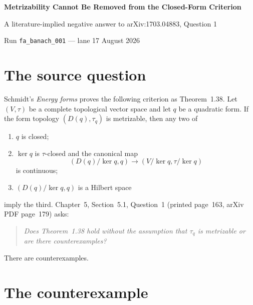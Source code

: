\documentclass[11pt]{article}
\begin{document}
\begin{center}
{\Large\bfseries Metrizability Cannot Be Removed from the Closed-Form Criterion}\par
\vspace{0.5em}
{\large A literature-implied negative answer to arXiv:1703.04883, Question 1}\par
\vspace{0.4em}
Run \texttt{fa\_banach\_001} --- lane 17  August 2026
\end{center}

\medskip
\noindent{}

\section{The source question}

Schmidt's \emph{Energy forms} \cite{Schmidt} proves the following criterion as Theorem~1.38. Let $(V,\tau)$ be a complete topological vector space and let $q$ be a quadratic form. If the form topology $(D(q),\tau_q)$ is metrizable, then any two of
\begin{enumerate}
\item[(i)] $q$ is closed;
\item[(ii)] $\ker q$ is $\tau$-closed and the canonical map
\[
(D(q)/\ker q,q)\longrightarrow (V/\ker q,\tau/\ker q)
\]
is continuous;
\item[(iii)] $(D(q)/\ker q,q)$ is a Hilbert space
\end{enumerate}
imply the third. Chapter~5, Section~5.1, Question~1 (printed page~163, arXiv PDF page~179) asks:

\begin{quote}\itshape
Does Theorem~1.38 hold without the assumption that $\tau_q$ is metrizable or are there counterexamples?
\end{quote}

There are counterexamples.

\section{The counterexample}
\end{document}
